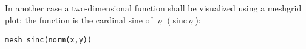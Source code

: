 \documentclass[DIV=14,headsepline,footsepline]{scrbook}
\begin{document}
				In another case a two-dimensional function shall be visualized using a meshgrid plot: the function is the cardinal sine of $\varrho$ ($\text{sinc}\,\varrho$):
				\begin{lstlisting}
mesh sinc(norm(x,y))
				\end{lstlisting}
				\begin{figure}[p]%
					\centering
					\\
					\\

\end{figure}
\end{document}
